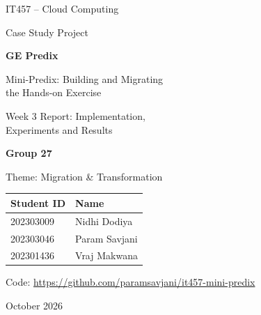 \documentclass[12pt,a4paper]{article}
\begin{document}
\begin{titlepage}
\centering
\vspace*{2cm}
{\large IT457 -- Cloud Computing\par}
\vspace{0.3cm}
{\large Case Study Project\par}
\vspace{2cm}
{\Huge\bfseries\color{head} GE Predix\par}
\vspace{0.4cm}
{\LARGE Mini-Predix: Building and Migrating\\[4pt] the Hands-on Exercise\par}
\vspace{1.5cm}
{\Large Week 3 Report: Implementation,\\[4pt] Experiments and Results\par}
\vspace{2.2cm}
{\large\bfseries Group 27\par}
\vspace{0.3cm}
{\large Theme: Migration \& Transformation\par}
\vspace{0.8cm}
\begin{tabular}{ll}
\toprule
\textbf{Student ID} & \textbf{Name} \\
\midrule
202303009 & Nidhi Dodiya \\
202303046 & Param Savjani \\
202301436 & Vraj Makwana \\
\bottomrule
\end{tabular}
\vfill
{\large Code: \url{https://github.com/paramsavjani/it457-mini-predix}\par}
\vspace{0.3cm}
{\large October 2026\par}
\end{titlepage}

\setcounter{tocdepth}{1}
\tableofcontents
\newpage

\end{document}
